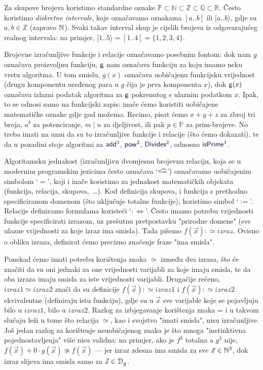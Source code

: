 Za skupove brojeva koristimo standardne oznake $\mathbb P\subset
\mathbb N\subset
\mathbb Z\subset
\mathbb Q\subset
\mathbb R$. Često koristimo \emph{diskretne intervale}, koje označavamo oznakama $[a..b]$ ili $[a..b\rangle$, gdje su $a,b\in\mathbb Z$ (zapravo ${\mathbb N}$). Svaki takav interval skup je cijelih brojeva iz odgovarajućeg realnog intervala: na primjer, $[1..5\rangle=[1..4]=\{1,2,3,4\}$.

Brojevne izračunljive funkcije i relacije označavamo posebnim fontom: dok nam $g$ označava proizvoljnu funkciju, $\f{g}$ nam označava funkciju za koju imamo neku vrstu algoritma. U tom smislu, $g(x)$ označava uobičajenu funkcijsku vrijednost (drugu komponentu uređenog para u $g$ čija je prva komponenta $x$), dok $\f{g}(x)$ označava izlazni podatak algoritma za $\f{g}$ pokrenutog s ulaznim podatkom $x$. Ipak, to se odnosi samo na funkcijski zapis: inače ćemo koristiti uobičajene matematičke oznake gdje god možemo. Recimo, pisat ćemo $x+y+z$ za zbroj tri broja, $a^b$ za potenciranje, $m\mid n$ za djeljivost, ili pak $p\in\mathbb P$ za prim-brojeve. No treba imati na umu da su to izračunljive funkcije i relacije (što ćemo dokazati), te da u pozadini stoje algoritmi za $\f{add}^3$, $\f{pow}^2$, $\f{Divides}^2$, odnosno $\f{isPrime}^1$.

\begin{napomena}\label{nap:parcdef}
Algoritamsku jednakost (izračunljivu dvomjesnu brojevnu relaciju, koja se u modernim programskim jezicima često označava `\t{==}') oz\-na\-ča\-va\-mo uobičajenim simbolom `$=$', koji i inače koristimo za jednakost matematičkih objekata (funkcija, relacija, skupova,~\ldots). Kod definicija skupova, i funkcija s prethodno specificiranom domenom (što uključuje totalne funkcije), koristimo simbol `$:=$'. Relacije definiramo formulama koristeći `$:\Longleftrightarrow$'. Često imamo potrebu vrijednosti funkcije specificirati izrazom, uz prešutnu pretpostavku "prirodne domene" (sve ulazne vrijednosti za koje izraz ima smisla). Tada pišemo $f(\vec x):\simeq izraz$. Ovisno o obliku izraza, definirat ćemo precizno značenje fraze "ima smisla".
\end{napomena}

Ponekad ćemo imati potrebu korištenja znaka $\simeq$ između dva izraza, što će značiti da su oni jednaki za one vrijednosti varijabli za koje imaju smisla, te da oba izraza imaju smisla za iste vrijednosti varijabli. Drugačije rečeno, $izraz1\simeq izraz2$ znači da su definicije $f(\vec x):\simeq izraz1$ i $f(\vec x):\simeq izraz2$ ekvivalentne (definiraju istu funkciju), gdje su u $\vec x$ sve varijable koje se pojavljuju bilo u $izraz1$, bilo u $izraz2$. Razlog za izbjegavanje korištenja znaka = i u takvom slučaju leži u tome što relacija $\simeq$, kao i svojstvo "imati smisla", nisu izračunljive. Još jedan razlog za korištenje neuobičajenog znaka je što mnoga "instinktivna pojednostavljenja" više nisu validna: na primjer, ako je $f^3$ totalna a $g^3$ nije, $f(\vec x)+0\cdot g(\vec x)\not\simeq f(\vec x)$ --- jer izraz zdesna ima smisla za sve $\vec x\in{\mathbb N}^3$, dok izraz slijeva ima smisla samo za $\vec x\in\mathcal D_{g}$.


